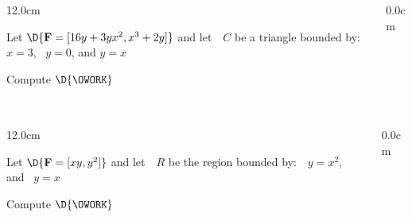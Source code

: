 \begin{frame}
\frametitle{}
\scriptsize
\begin{columns}
\begin{column}{12.0cm}

\EX Let $\D{{\bf F} = [16y + 3yx^2, x^3 + 2y]}$ and let \,\, $C$ be a triangle bounded by: \,\, $x=3$, \, $y=0$, and $y=x$

\vspace{0.2cm}

Compute \quad $\D{\OWORK}$

\vspace{0.2cm}

\SOL

\vspace{7.2cm}

\end{column}
\begin{column}{0.0cm}\end{column}
\end{columns}
\end{frame}

\begin{frame}
\frametitle{}
\scriptsize
\begin{columns}
\begin{column}{12.0cm}

\EX Let $\D{{\bf F} = [xy, y^2]}$ and let \,\, $R$ be the region bounded by: \,\, $y=x^2$, \, and \, $y=x$

\vspace{0.2cm}

Compute \quad $\D{\OWORK}$

\vspace{0.2cm}

\SOL

\vspace{7.2cm}

\end{column}
\begin{column}{0.0cm}\end{column}
\end{columns}
\end{frame}

